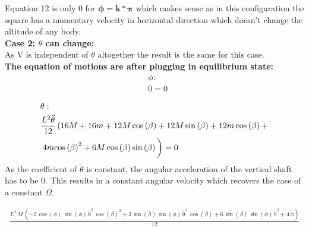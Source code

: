 \noindent Equation 12 is only 0 for $\boldsymbol{\phi = k*\pi}$ which makes sense as in this configuration the square has a momentary velocity in horizontal direction which doesn't change the altitude of any body.\vspace{0.5cm}\\

\textbf{Case 2: $\dot\theta$ can change:} \vspace{0.3cm}\\

As V is independent of $\theta$ altogether the result is the same for this case.\vspace{3mm}\\

\noindent \textbf{The equation of motions are after plugging in equilibrium state:}\vspace{3mm}\\


\begin{equation}
    \begin{split}
        &\phi:\\
        &0 = 0
    \end{split}
\end{equation}

\begin{equation}
    \begin{split}
        &\theta:\\
        &\frac{L^2\mathrm{\ddot\theta}}{12}\left(16M+16m+12M\cos\left(\beta \right)+12M\sin\left(\beta \right)+12m\cos\left(\beta \right)+\right.\\
        &\left.4m{\cos\left(\beta \right)}^2+6M\cos\left(\beta \right)\sin\left(\beta \right)\vphantom{\int_1^2}\right) = 0
    \end{split}
\end{equation}
As the coefficient of $\ddot\theta$ is constant, the angular acceleration of the vertical shaft has to be 0. This results in a constant angular velocity which recovers the case of a constant $\Omega$.


\begin{equation}
    \begin{split}
        \frac{L^2\,M\,\left(-2\,\cos\left(\phi \right)\,\sin\left(\phi \right)\,{\mathrm{\dot \theta}}^2\,{\cos\left(\beta \right)}^2+3\,\sin\left(\beta \right)\,\sin\left(\phi \right)\,{\mathrm{\dot \theta}}^2\,\cos\left(\beta \right)+6\,\sin\left(\beta \right)\,\sin\left(\phi \right)\,{\mathrm{\dot \theta}}^2+4\,\mathrm{\ddot \phi}\right)}{12}
    \end{split}
\end{equation}
